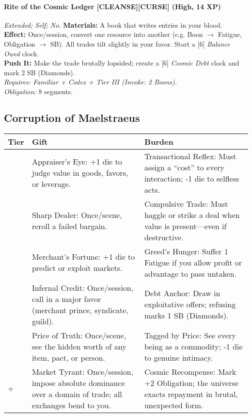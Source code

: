 \paragraph{Rite of the Cosmic Ledger \textnormal{[CLEANSE][CURSE]} (High, 14 XP)} \emph{Extended; Self; No.}  
\textbf{Materials:} A book that writes entries in your blood.\\
\textbf{Effect:} Once/session, convert one resource into another (e.g. Boon $\rightarrow$ Fatigue, Obligation $\rightarrow$ SB). All trades tilt slightly in your favor. Start a [6] \emph{Balance Owed} clock.\\
\textbf{Push It:} Make the trade brutally lopsided; create a [6] \emph{Cosmic Debt} clock and mark 2 SB (Diamonds).\\
\emph{Requires: Familiar + Codex + Tier III (\textit{Invoke:} 2 Boons).}\\
\emph{Obligation:} 8 segments.


\subsection*{Corruption of Maelstraeus}
\label{sec:maelstraeus-corruption}

\begin{longtable}{>{\raggedright\arraybackslash}p{1cm} p{5cm} p{5cm}}
\toprule
\textbf{Tier} & \textbf{Gift} & \textbf{Burden} \\
\midrule
1 & Appraiser’s Eye: +1 die to judge value in goods, favors, or leverage. & Transactional Reflex: Must assign a “cost” to every interaction; -1 die to selfless acts. \\
\midrule
2 & Sharp Dealer: Once/scene, reroll a failed bargain. & Compulsive Trade: Must haggle or strike a deal when value is present—even if destructive. \\
\midrule
3 & Merchant’s Fortune: +1 die to predict or exploit markets. & Greed’s Hunger: Suffer 1 Fatigue if you allow profit or advantage to pass untaken. \\
\midrule
4 & Infernal Credit: Once/session, call in a major favor (merchant prince, syndicate, guild). & Debt Anchor: Draw in exploitative offers; refusing marks 1 SB (Diamonds). \\
\midrule
5 & Price of Truth: Once/scene, see the hidden worth of any item, pact, or person. & Tagged by Price: See every being as a commodity; -1 die to genuine intimacy. \\
\midrule
6+ & Market Tyrant: Once/session, impose absolute dominance over a domain of trade; all exchanges bend to you. & Cosmic Recompense: Mark +2 Obligation; the universe exacts repayment in brutal, unexpected form. \\
\bottomrule
\end{longtable}